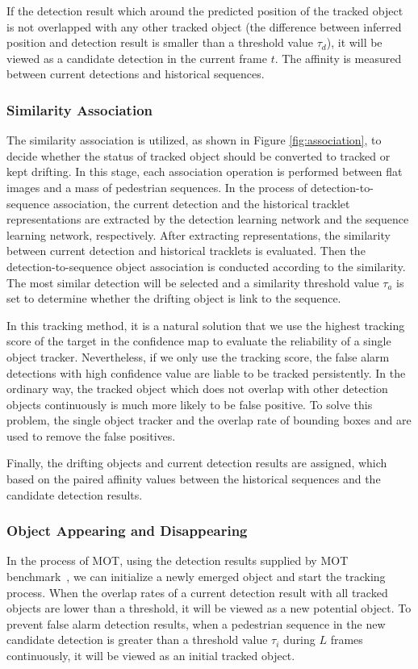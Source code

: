 \documentclass[times,twocolumn,final,authoryear]{elsarticle}
\begin{document}
If the detection result which around the predicted position of the tracked object is not overlapped with any other tracked object (the difference between inferred position and detection result is smaller than a threshold value $ \tau _d $), it will be viewed as a candidate detection in the current frame $t$. 
The affinity is measured between current detections and historical sequences. 

\vspace{5pt}
\noindent
\subsubsection{Similarity Association}
The similarity association is utilized, as shown in Figure \ref{fig:association}, to decide whether the status of tracked object should be converted to tracked or kept drifting.
In this stage, each association operation is performed between flat images and a mass of pedestrian sequences.
In the process of detection-to-sequence association, the current detection and the historical tracklet representations are extracted by the detection learning network and the sequence learning network, respectively.
After extracting representations, the similarity between current detection and historical tracklets is evaluated.
Then the detection-to-sequence object association is conducted according to the similarity.
The most similar detection will be selected and a similarity threshold value $ \tau_a $ is set to determine whether the drifting object is link to the sequence. 

In this tracking method, it is a natural solution that we use the highest tracking score of the target in the confidence map to evaluate the reliability of a single object tracker.
Nevertheless, if we only use the tracking score, the false alarm detections with high confidence value are liable to be tracked persistently.
In the ordinary way, the tracked object which does not overlap with other detection objects continuously is much more likely to be false positive.
To solve this problem, the single object tracker and the overlap rate of bounding boxes and are used to remove the false positives.

Finally, the drifting objects and current detection results are assigned, which based on the paired affinity values between the historical sequences and the candidate detection results.

\vspace{5pt}
\noindent
\subsubsection{Object Appearing and Disappearing}
In the process of MOT, using the detection results supplied by MOT benchmark~\citep{RN583}, we can initialize a newly emerged object and start the tracking process.
When the overlap rates of a current detection result with all tracked objects are lower than a threshold, it will be viewed as a new potential object.
To prevent false alarm detection results, when a pedestrian sequence in the new candidate detection is greater than a threshold value $\tau_i$ during $L$ frames continuously, it will be viewed as an initial tracked object.
\end{document}
